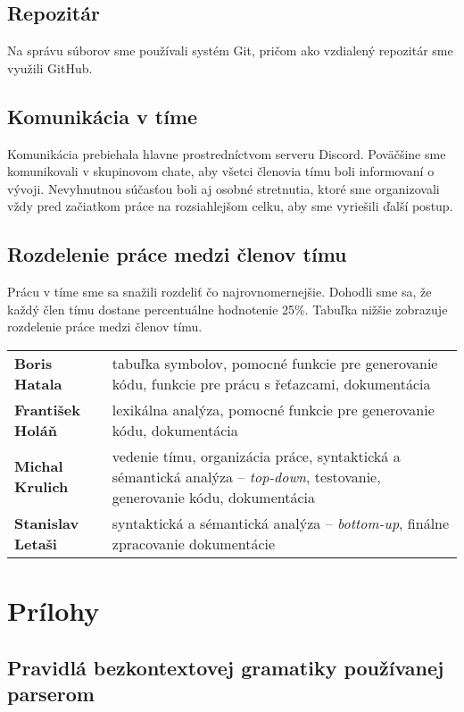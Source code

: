 \documentclass[a4paper,11pt]{article}
\begin{document}
\subsection{Repozitár}
Na správu súborov sme používali systém Git, pričom ako vzdialený repozitár sme využili GitHub.

\subsection{Komunikácia v tíme}
Komunikácia prebiehala hlavne prostredníctvom serveru Discord. Poväčšine sme komunikovali v skupinovom chate, aby všetci členovia tímu boli informovaní o vývoji.
Nevyhnutnou súčasťou boli aj osobné stretnutia, ktoré sme organizovali vždy pred začiatkom práce na rozsiahlejšom celku, aby sme vyriešili ďalší postup.
\newpage
\subsection{Rozdelenie práce medzi členov tímu}
Prácu v tíme sme sa snažili rozdeliť čo najrovnomernejšie. Dohodli sme sa, že každý člen tímu dostane percentuálne hodnotenie 25\%. Tabuľka nižšie zobrazuje rozdelenie práce medzi členov tímu.

\medskip

\begin{tabular}{lp{11.9cm}}
	\textbf{Boris Hatala} & tabuľka symbolov, pomocné funkcie pre generovanie kódu, funkcie pre prácu s řeťazcami, dokumentácia \\
	\textbf{František Holáň}  & lexikálna analýza, pomocné funkcie pre generovanie kódu, dokumentácia \\
	\textbf{Michal Krulich} & vedenie tímu, organizácia práce, syntaktická a sémantická analýza – \textit{top-down}, testovanie, generovanie kódu, dokumentácia \\
	\textbf{Stanislav Letaši} & syntaktická a sémantická analýza – \textit{bottom-up}, finálne zpracovanie dokumentácie \\
\end{tabular}


\medskip
\newpage
\appendix
\section{Prílohy}
\subsection{Pravidlá bezkontextovej gramatiky používanej parserom}
\end{document}
